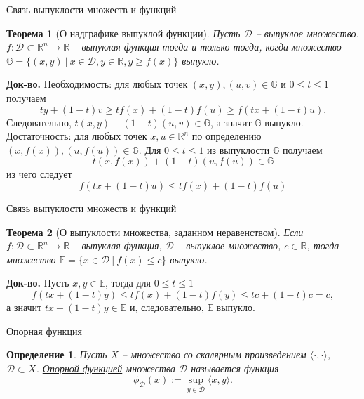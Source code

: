 \documentclass[10pt, handout]{beamer}
\newtheorem{theorem_ru}{Теорема}[]
\newtheorem{definition_ru}{Определение}[]
\begin{document}
\begin{frame}{Связь выпуклости множеств и функций}
\begin{theorem_ru}[О надграфике выпуклой функции]
Пусть $\mathcal{D}$ -- выпуклое множество.
$f:\mathcal{D}\subset \mathbb{R}^n\rightarrow \mathbb{R}$ -- выпуклая функция тогда и только тогда, когда множество $\mathbb{G}=\{(x, y)~|~x\in \mathcal{D}, y\in \mathbb{R}, y\geq f(x)\}$ выпукло.
\end{theorem_ru}
\pause
\textbf{Док-во.} 
Необходимость: для любых точек $(x, y), (u, v)\in \mathbb{G}$ и $0\leq t\leq 1$ получаем
$$
ty+(1-t)v\geq tf(x)+(1-t)f(u)\geq f(tx+(1-t)u).
$$
\pause
Следовательно, $t(x,y)+(1-t)(u,v)\in \mathbb{G}$, а значит $\mathbb{G}$ выпукло.\\
\pause
Достаточность: для любых точек $x, u \in \mathbb{R}^n$ по определению $(x, f(x)), (u, f(u))\in \mathbb{G}$. Для $0\leq t\leq 1$ из  
выпуклости $\mathbb{G}$ получаем
$$
t(x,f(x))+(1-t)(u,f(u))\in \mathbb{G}
$$
из чего следует
$$
f(tx + (1-t)u)\leq tf(x)+(1-t)f(u)
$$

\end{frame}

\begin{frame}{Связь выпуклости множеств и функций}
\begin{theorem_ru}[О выпуклости множества, заданном неравенством]
Если $f:\mathcal{D}\subset \mathbb{R}^n\rightarrow \mathbb{R}$ -- выпуклая функция, $\mathcal{D}$ -- выпуклое множество, $c\in \mathbb{R}$, тогда множество $\mathbb{E}=\{x\in \mathcal{D}~|~f(x)\leq c\}$ выпукло.
\end{theorem_ru}
\pause
\textbf{Док-во.} Пусть $x, y\in \mathbb{E}$, тогда для $0\leq t\leq 1$
$$
f(tx+(1-t)y)\leq tf(x)+(1-t)f(y)\leq tc+(1-t)c=c,
$$
а значит $tx+(1-t)y\in \mathbb{E}$ и, следовательно, $\mathbb{E}$ выпукло.
\end{frame}

\begin{frame}{Опорная функция}
\begin{definition_ru}
Пусть $X$ -- множество со скалярным произведением $\langle \cdot, \cdot \rangle$, $\mathcal{D}\subset X$. \underline{Опорной функцией}
множества $\mathcal{D}$ называется функция
$$
\phi_\mathcal{D}(x):=\sup_{y\in\mathcal{D}}\langle x, y \rangle.
$$
\end{definition_ru}
\end{frame}
\end{document}
